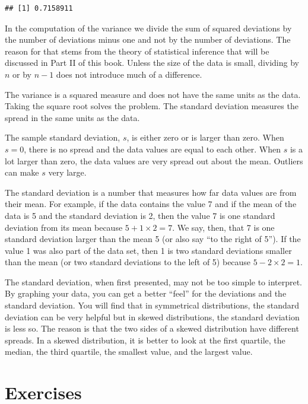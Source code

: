 \documentclass[
]{krantz}
\theoremstyle{definition}
\theoremstyle{definition}
\theoremstyle{definition}
\theoremstyle{remark}
\begin{document}
\begin{verbatim}
## [1] 0.7158911
\end{verbatim}

In the computation of the variance we divide the sum of squared
deviations by the number of deviations minus one and not by the number
of deviations. The reason for that stems from the theory of statistical
inference that will be discussed in Part II of this book. Unless the
size of the data is small, dividing by \(n\) or by \(n-1\) does not
introduce much of a difference.

The variance is a squared measure and does not have the same units as
the data. Taking the square root solves the problem. The standard
deviation measures the spread in the same units as the data.

The sample standard deviation, \(s\), is either zero or is larger than
zero. When \(s=0\), there is no spread and the data values are equal to
each other. When \(s\) is a lot larger than zero, the data values are very
spread out about the mean. Outliers can make \(s\) very large.

The standard deviation is a number that measures how far data values are
from their mean. For example, if the data contains the value 7 and if
the mean of the data is 5 and the standard deviation is 2, then the
value 7 is one standard deviation from its mean because
\(5 + 1 \times 2 = 7\). We say, then, that 7 is one standard deviation
larger than the mean 5 (or also say ``to the right of 5''). If the value 1
was also part of the data set, then 1 is two standard deviations smaller
than the mean (or two standard deviations to the left of 5) because
\(5 - 2 \times 2 = 1\).

The standard deviation, when first presented, may not be too simple to
interpret. By graphing your data, you can get a better ``feel'' for the
deviations and the standard deviation. You will find that in symmetrical
distributions, the standard deviation can be very helpful but in skewed
distributions, the standard deviation is less so. The reason is that the
two sides of a skewed distribution have different spreads. In a skewed
distribution, it is better to look at the first quartile, the median,
the third quartile, the smallest value, and the largest value.

\hypertarget{exercises-2}{%
\section{Exercises}\label{exercises-2}}
\end{document}
